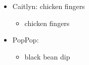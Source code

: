 \documentclass[11pt]{book}
\begin{document}
\begin{itemize}
    \item Caitlyn: chicken fingers
          \begin{itemize}
              \item chicken fingers
          \end{itemize}

    \item PopPop:
          \begin{itemize}
              \item black bean dip
          \end{itemize}
\end{itemize}

\backmatter
\CookbookIndex{}
\end{document}
